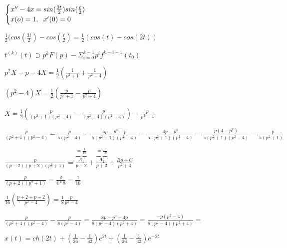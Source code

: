 \begin{Large}
\vspace{0.5cm}
$
\begin{cases}
x^{\prime\prime} -4x = sin(\frac{3t}{2})sin(\frac{t}{2})
\\
x(o) = 1, 	\text{\hspace{0.2cm}} x^{\prime}(0) = 0
\end{cases}
$

\vspace{0.5cm}
$
\frac{1}{2}(cos(\frac{3t}{2}) - cos(\frac{t}{2}) = \frac{1}{2}(cos(t) - cos(2t))
$

\vspace{0.5cm}
$
t^{(k)}(t) \supset p^kF(p) - \Sigma_{i=0}^{k-1}p^if^{k-i-1}(t_0)
$

\vspace{0.5cm}
$
p^2X - p  - 4X = \frac{1}{2}(\frac{1}{p^2+1} +\frac{1}{p^2 - 4})
$

\vspace{0.5cm}
$
(p^2-4)X = \frac{1}{2}(\frac{p}{p^2+1} - \frac{p}{p^2+4})
$

\vspace{0.5cm}
$
X = \frac{1}{2}(\frac{p}{(p^2 + 1)(p^2 - 4)} - \frac{p}{(p^2 + 4)(p^2 -4)}) 
+
\frac{p}{p^2 - 4}
$


\vspace{0.5cm}
$
\frac{p}{(p^2+1)(p^2-4)} - \frac{p}{5(p^2 -4)} = \frac{5p - p^3 + p}{5(p^2+1)(p^2-4)}
= 
\frac{4p - p^3}{5(p^2+1)(p^2-4)}
= 
\frac{p(4-p^2)}{5(p^2+1)(p^2-4)}
=
\frac{-p}{5(p^2+1)}
$

\vspace{0.5cm}
$
\frac{p}{(p-2)(p+2)(p^2+1)} = \overbrace{\frac{A_1}{p-2}}^{=\frac{1}{16}}
 + 
\overbrace{\frac{A_2}{p+2}}^{=\frac{1}{16}}
+
\frac{Bp + C}{p^2 + 4}
$

\vspace{0.5cm}
$
\frac{p}{(p+2)(p^2+1)} = \frac{2}{4*8} = \frac{1}{16}
$

\vspace{0.5cm}
$
\frac{1}{16}(\frac{p+2 +p-2}{p^2 -4}) = \frac{1}{8}\frac{p}{p^2 - 4}
$

\vspace{0.5cm}
$
\frac{p}{(p^2 + 4)(p^2 - 4)} - \frac{p}{8(p^2 - 4)} 
=
\frac{8p-p^3-4p}{8(p^2-4)(p^2 +4)}
=
\frac{-p(p^2 -4)}{8(p^2-4)(p^2 +4)}
=
$


\vspace{0.5cm}
$
x(t) = ch(2t) + (\frac{1}{26} - \frac{1}{32})e^{2t}
+
(\frac{1}{26} - \frac{1}{32})e^{-2t}
$
\end{Large}

